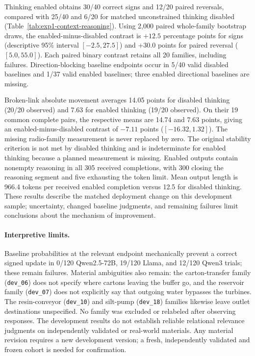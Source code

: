 Thinking enabled obtains 30/40 correct signs and 12/20 paired reversals, compared
with 25/40 and 6/20 for matched unconstrained thinking disabled
(Table~\ref{tab:exp1-context-reasoning}). Using 2,000 paired whole-family
bootstrap draws, the enabled-minus-disabled contrast is $+12.5$ percentage
points for signs (descriptive 95\% interval $[-2.5,27.5]$) and $+30.0$ points
for paired reversal ($[5.0,55.0]$). Each paired binary contrast retains all
20 families, including failures. Direction-blocking baseline endpoints occur
in 5/40 valid disabled baselines and 1/37 valid enabled baselines; three enabled
directional baselines are missing.

Broken-link absolute movement averages 14.05 points for disabled thinking
(20/20 observed) and 7.63 for enabled thinking (19/20 observed). On their
19 common complete pairs, the respective means are 14.74 and 7.63 points,
giving an enabled-minus-disabled contrast of $-7.11$ points
($[-16.32,1.32]$). The missing radio-family measurement is never replaced
by zero. The original stability criterion is not met by disabled thinking
and is indeterminate for enabled thinking because a planned measurement is
missing. Enabled outputs contain nonempty reasoning in all 305 received
completions, with 300 closing the reasoning segment and five exhausting the
token limit. Mean output length is 966.4 tokens per received enabled completion
versus 12.5 for disabled thinking. These results describe the matched deployment
change on this development sample; uncertainty, changed baseline judgments,
and remaining failures limit conclusions about the mechanism of improvement.

\paragraph{Interpretive limits.}
Baseline probabilities at the relevant endpoint mechanically prevent a correct
signed update in 0/120 Qwen2.5-72B, 19/120 Llama, and 12/120 Qwen3 trials; these
remain failures. Material ambiguities also remain: the carton-transfer family
(\texttt{dev\_06}) does not specify where cartons leaving the buffer go, and the
reservoir family (\texttt{dev\_07}) does not explicitly say that outgoing water
bypasses the turbines. The resin-conveyor (\texttt{dev\_10}) and silt-pump
(\texttt{dev\_18}) families likewise leave outlet destinations unspecified. No family was excluded or relabeled after observing
responses. The development results do not establish reliable relational relevance
judgments on independently validated or real-world materials. Any material revision requires a new development version; a fresh,
independently validated and frozen cohort is needed for confirmation.
